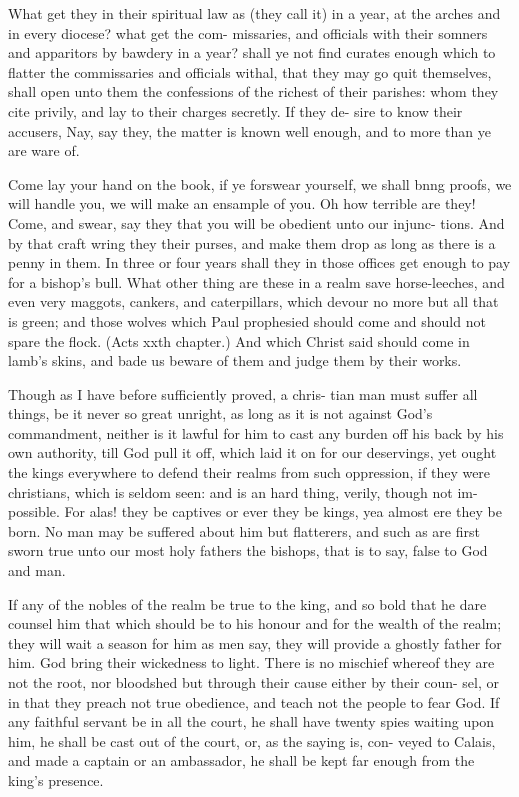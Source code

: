 \documentclass{custom}
\begin{document}
What get they in their spiritual law as (they call it) in a 
year, at the arches and in every diocese? what get the com- 
missaries, and officials with their somners and apparitors 
by bawdery in a year? shall ye not find curates enough 
which to flatter the commissaries and officials withal, that 
they may go quit themselves, shall open unto them the 
confessions of the richest of their parishes: whom they 
cite privily, and lay to their charges secretly. If they de- 
sire to know their accusers, Nay, say they, the matter is 
known well enough, and to more than ye are ware of. 

Come lay your hand on the book, if ye forswear yourself,
we shall bnng proofs, we will handle you, we will make
an ensample of you. Oh how terrible are they! Come, and 
swear, say they that you will be obedient unto our injunc- 
tions. And by that craft wring they their purses, and 
make them drop as long as there is a penny in them. In 
three or four years shall they in those offices get enough to 
pay for a bishop's bull. What other thing are these in a 
realm save horse-leeches, and even very maggots, cankers, 
and caterpillars, which devour no more but all that is green; 
and those wolves which Paul prophesied should come and 
should not spare the flock. (Acts xxth chapter.) And 
which Christ said should come in lamb's skins, and bade us 
beware of them and judge them by their works. 

Though as I have before sufficiently proved, a chris-
tian man must suffer all things, be it never so great unright,
as long as it is not against God's commandment, neither is
it lawful for him to cast any burden off his back by his
own authority, till God pull it off, which laid it on for our
deservings, yet ought the kings everywhere to defend their 
realms from such oppression, if they were christians, which 
is seldom seen: and is an hard thing, verily, though not im- 
possible. For alas! they be captives or ever they be kings, 
yea almost ere they be born. No man may be suffered 
about him but flatterers, and such as are first sworn true 
unto our most holy fathers the bishops, that is to say, false 
to God and man. 

If any of the nobles of the realm be true to the king, 
and so bold that he dare counsel him that which should be 
to his honour and for the wealth of the realm; they will 
wait a season for him as men say, they will provide a 
ghostly father for him. God bring their wickedness to 
light. There is no mischief whereof they are not the root, 
nor bloodshed but through their cause either by their coun- 
sel, or in that they preach not true obedience, and teach 
not the people to fear God. If any faithful servant be in 
all the court, he shall have twenty spies waiting upon him, 
he shall be cast out of the court, or, as the saying is, con- 
veyed to Calais, and made a captain or an ambassador, he 
shall be kept far enough from the king's presence. 
\end{document}
